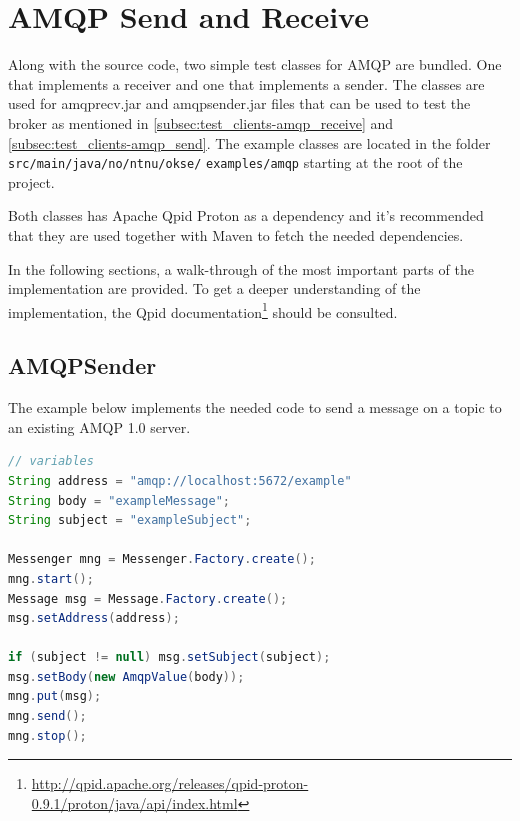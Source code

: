 \section{AMQP Send and Receive}
Along with the source code, two simple test classes for AMQP are bundled. One that implements a receiver and one that implements a sender. The classes are used for amqprecv.jar and amqpsender.jar files that can be used to test the broker as mentioned in \ref{subsec:test_clients-amqp_receive} and \ref{subsec:test_clients-amqp_send}. The example classes are located in the folder \verb!src/main/java/no/ntnu/okse/! \verb!examples/amqp! starting at the root of the project.

Both classes has Apache Qpid Proton as a dependency and it's recommended that they are used together with Maven to fetch the needed dependencies.

In the following sections, a walk-through of the most important parts of the implementation are provided. To get a deeper understanding of the implementation, the Qpid documentation\footnote{\url{http://qpid.apache.org/releases/qpid-proton-0.9.1/proton/java/api/index.html}} should be consulted.

\subsection{AMQPSender}
The example below implements the needed code to send a message on a topic to an existing AMQP 1.0 server.

\begin{lstlisting}[language=Java, captionpos=b, caption=Example use of Messenger to subscribe, frame=bt, showstringspaces=false,label={lst:AMQPSender}]
// variables
String address = "amqp://localhost:5672/example"
String body = "exampleMessage";
String subject = "exampleSubject";

Messenger mng = Messenger.Factory.create();
mng.start();
Message msg = Message.Factory.create();
msg.setAddress(address);

if (subject != null) msg.setSubject(subject);
msg.setBody(new AmqpValue(body));
mng.put(msg);
mng.send();
mng.stop();
\end{lstlisting}


